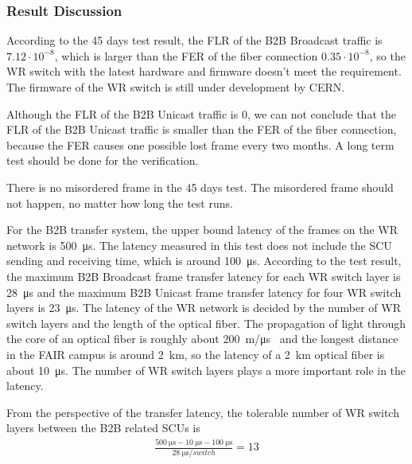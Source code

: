 \subsubsection{Result Discussion}


According to the 45 days test result, the FLR of the B2B Broadcast traffic is $7.12\cdot10^{-8}$, which is larger than the FER of the fiber connection $0.35\cdot10^{-8}$, so the WR switch with the latest hardware and firmware doesn't meet the requirement. The firmware of the WR switch is still under development by CERN.

Although the FLR of the B2B Unicast traffic is 0, we can not conclude that the FLR of the B2B Unicast traffic is smaller than the FER of the fiber connection, because the FER causes one possible lost frame every two months. A long term test should be done for the verification. 

There is no misordered frame in the 45 days test. The misordered frame should not happen, no matter how long the test runs.

For the B2B transfer system, the upper bound latency of the frames on the WR network is \SI{500}{\us}. The latency measured in this test does not include the SCU sending and receiving time, which is around \SI{100}{\us}. According to the test result, the maximum B2B Broadcast frame transfer latency for each WR switch layer is \SI{28}{\micro\second} and the maximum B2B Unicast frame transfer latency for four WR switch layers is  \SI{23}{\micro\second}. The latency of the WR network is decided by the number of WR switch layers and the length of the optical fiber. The propagation of light through the core of an optical fiber is roughly about \SI{200}{\meter/\us}~\cite{noauthor_calculating_2012} and the longest distance in the FAIR campus is around \SI{2}{\kilo\meter}, so the latency of a \SI{2}{\kilo\meter} optical fiber is about \SI{10}{\us}. The number of WR switch layers plays a more important role in the latency. 

From the perspective of the transfer latency, the tolerable number of WR switch layers between the B2B related \gls{SCU}s is 
		\begin{equation}
		\begin{aligned}
			\frac{\SI{500}{\us}-\SI{10}{\us}-\SI{100}{\us}}{\SI{28}{\us/switch}}=13
		\label {num_switch_b}
		\end{aligned}
		\end{equation}

